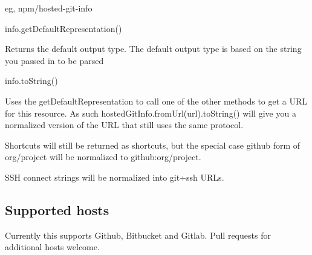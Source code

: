 eg, {\ttfamily npm/hosted-\/git-\/info}


\begin{DoxyItemize}
\item info.\+get\+Default\+Representation()
\end{DoxyItemize}

Returns the default output type. The default output type is based on the string you passed in to be parsed


\begin{DoxyItemize}
\item info.\+to\+String()
\end{DoxyItemize}

Uses the get\+Default\+Representation to call one of the other methods to get a U\+RL for this resource. As such {\ttfamily hosted\+Git\+Info.\+from\+Url(url).to\+String()} will give you a normalized version of the U\+RL that still uses the same protocol.

Shortcuts will still be returned as shortcuts, but the special case github form of {\ttfamily org/project} will be normalized to {\ttfamily github\+:org/project}.

S\+SH connect strings will be normalized into {\ttfamily git+ssh} U\+R\+Ls.

\subsection*{Supported hosts}

Currently this supports Github, Bitbucket and Gitlab. Pull requests for additional hosts welcome. 